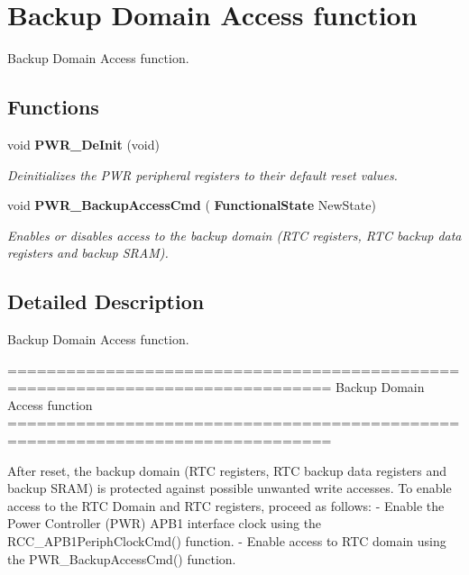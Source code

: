 \section{Backup Domain Access function}
\label{group__PWR__Group1}


Backup Domain Access function.  


\subsection*{Functions}
\begin{DoxyCompactItemize}
\item 
void \textbf{ P\+W\+R\+\_\+\+De\+Init} (void)
\begin{DoxyCompactList}\small\item\em Deinitializes the P\+WR peripheral registers to their default reset values. \end{DoxyCompactList}\item 
void \textbf{ P\+W\+R\+\_\+\+Backup\+Access\+Cmd} (\textbf{ Functional\+State} New\+State)
\begin{DoxyCompactList}\small\item\em Enables or disables access to the backup domain (R\+TC registers, R\+TC backup data registers and backup S\+R\+AM). \end{DoxyCompactList}\end{DoxyCompactItemize}


\subsection{Detailed Description}
Backup Domain Access function. 

\begin{DoxyVerb} ===============================================================================
                            Backup Domain Access function 
 ===============================================================================  

  After reset, the backup domain (RTC registers, RTC backup data 
  registers and backup SRAM) is protected against possible unwanted 
  write accesses. 
  To enable access to the RTC Domain and RTC registers, proceed as follows:
    - Enable the Power Controller (PWR) APB1 interface clock using the
      RCC_APB1PeriphClockCmd() function.
    - Enable access to RTC domain using the PWR_BackupAccessCmd() function.\end{DoxyVerb}
 

